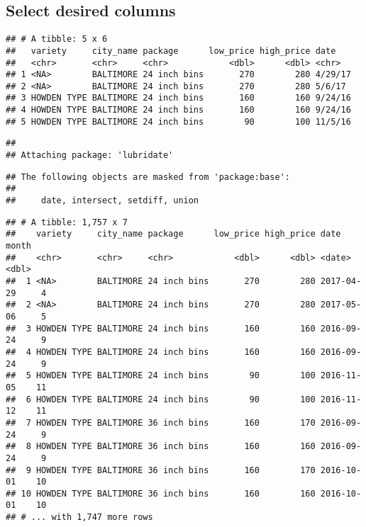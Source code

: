 \documentclass[
]{article}
\begin{document}
\hypertarget{select-desired-columns}{%
\subsection{Select desired columns}\label{select-desired-columns}}

\begin{verbatim}
## # A tibble: 5 x 6
##   variety     city_name package      low_price high_price date   
##   <chr>       <chr>     <chr>            <dbl>      <dbl> <chr>  
## 1 <NA>        BALTIMORE 24 inch bins       270        280 4/29/17
## 2 <NA>        BALTIMORE 24 inch bins       270        280 5/6/17 
## 3 HOWDEN TYPE BALTIMORE 24 inch bins       160        160 9/24/16
## 4 HOWDEN TYPE BALTIMORE 24 inch bins       160        160 9/24/16
## 5 HOWDEN TYPE BALTIMORE 24 inch bins        90        100 11/5/16
\end{verbatim}

\begin{verbatim}
## 
## Attaching package: 'lubridate'
\end{verbatim}

\begin{verbatim}
## The following objects are masked from 'package:base':
## 
##     date, intersect, setdiff, union
\end{verbatim}

\begin{verbatim}
## # A tibble: 1,757 x 7
##    variety     city_name package      low_price high_price date       month
##    <chr>       <chr>     <chr>            <dbl>      <dbl> <date>     <dbl>
##  1 <NA>        BALTIMORE 24 inch bins       270        280 2017-04-29     4
##  2 <NA>        BALTIMORE 24 inch bins       270        280 2017-05-06     5
##  3 HOWDEN TYPE BALTIMORE 24 inch bins       160        160 2016-09-24     9
##  4 HOWDEN TYPE BALTIMORE 24 inch bins       160        160 2016-09-24     9
##  5 HOWDEN TYPE BALTIMORE 24 inch bins        90        100 2016-11-05    11
##  6 HOWDEN TYPE BALTIMORE 24 inch bins        90        100 2016-11-12    11
##  7 HOWDEN TYPE BALTIMORE 36 inch bins       160        170 2016-09-24     9
##  8 HOWDEN TYPE BALTIMORE 36 inch bins       160        160 2016-09-24     9
##  9 HOWDEN TYPE BALTIMORE 36 inch bins       160        170 2016-10-01    10
## 10 HOWDEN TYPE BALTIMORE 36 inch bins       160        160 2016-10-01    10
## # ... with 1,747 more rows
\end{verbatim}
\end{document}
